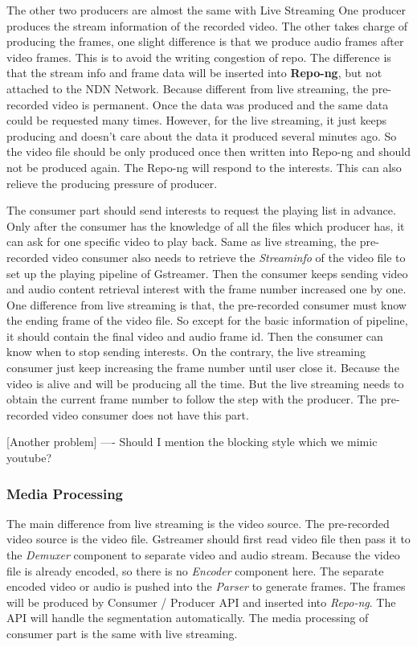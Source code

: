 The other two producers are almost the same with Live Streaming  One producer produces the stream information of the recorded video. The other takes charge of producing the frames, one slight difference is that we produce audio frames after video frames. This is to avoid the writing congestion of repo. The difference is that the stream info and frame data will be inserted into \textbf{Repo-ng}, but not attached to the NDN Network. Because different from live streaming, the pre-recorded video is permanent. Once the data was produced and the same data could be requested many times. However, for the live streaming, it just keeps producing and doesn't care about the data it produced several minutes ago. So the video file should be only produced once then written into Repo-ng and should not be produced again. The Repo-ng will respond to the interests. This can also relieve the producing pressure of producer.  

The consumer part should send interests to request the playing list in advance. Only after the consumer has the knowledge of all the files which producer has, it can ask for one specific video to play back. Same as live streaming, the pre-recorded video consumer also needs to retrieve the \textit{Streaminfo} of the video file to set up the playing pipeline of Gstreamer. Then the consumer keeps sending video and audio content retrieval interest with the frame number increased one by one. One difference from live streaming is that, the pre-recorded consumer must know the ending frame of the video file. So except for the basic information of pipeline, it should contain the final video and audio frame id. Then the consumer can know when to stop sending interests. On the contrary, the live streaming consumer just keep increasing the frame number until user close it. Because the video is alive and will be producing all the time. But the live streaming needs to obtain the current frame number to follow the step with the producer. The pre-recorded video consumer does not have this part.

[Another problem] ---- Should I mention the blocking style which we mimic youtube?

\subsubsection{Media Processing}

The main difference from live streaming is the video source. The pre-recorded video source is the video file. Gstreamer should first read video file then pass it to the \textit{Demuxer} component to separate video and audio stream. Because the video file is already encoded, so there is no \textit{Encoder} component here. The separate encoded video or audio is pushed into the \textit{Parser} to generate frames. The frames will be produced by Consumer / Producer API and inserted into \textit{Repo-ng}. The API will handle the segmentation automatically. The media processing of consumer part is the same with live streaming.


